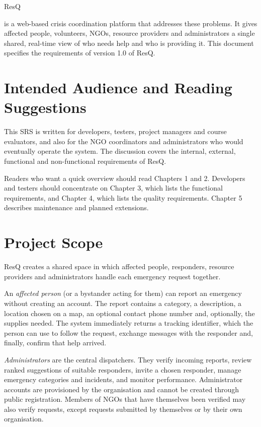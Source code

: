 \documentclass{scrreprt}
\begin{document}
\begin{bfseries}ResQ\end{bfseries} is a web-based crisis coordination platform that addresses these problems. It gives affected people, volunteers, NGOs, resource providers and administrators a single shared, real-time view of who needs help and who is providing it. This document specifies the requirements of version 1.0 of ResQ.

\section{Intended Audience and Reading Suggestions}
This SRS is written for developers, testers, project managers and course evaluators, and also for the NGO coordinators and administrators who would eventually operate the system. The discussion covers the internal, external, functional and non-functional requirements of ResQ.

Readers who want a quick overview should read Chapters 1 and 2. Developers and testers should concentrate on Chapter 3, which lists the functional requirements, and Chapter 4, which lists the quality requirements. Chapter 5 describes maintenance and planned extensions.

\section{Project Scope}
ResQ creates a shared space in which affected people, responders, resource providers and administrators handle each emergency request together.

An \emph{affected person} (or a bystander acting for them) can report an emergency without creating an account. The report contains a category, a description, a location chosen on a map, an optional contact phone number and, optionally, the supplies needed. The system immediately returns a tracking identifier, which the person can use to follow the request, exchange messages with the responder and, finally, confirm that help arrived.

\emph{Administrators} are the central dispatchers. They verify incoming reports, review ranked suggestions of suitable responders, invite a chosen responder, manage emergency categories and incidents, and monitor performance. Administrator accounts are provisioned by the organisation and cannot be created through public registration. Members of NGOs that have themselves been verified may also verify requests, except requests submitted by themselves or by their own organisation.
\end{document}
